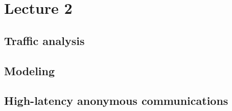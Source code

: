\documentclass[../overview.tex]{subfiles}
\begin{document}
\section{Lecture 2}
\subsection{Traffic analysis}

\subsection{Modeling}

\subsection{High-latency anonymous communications}
\end{document}
